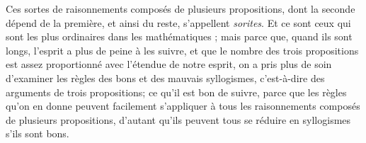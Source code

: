 Ces sortes de raisonnements composés de plusieurs propositions, dont la seconde dépend de la première, et ainsi du reste, s'appellent \emph{sorites}. Et ce sont ceux qui sont les plus ordinaires dans les mathématiques ; mais parce que, quand ils sont longs, l'esprit a plus de peine à les suivre, et que le nombre des trois propositions est assez proportionné avec l'étendue de notre esprit, on a pris plus de soin d'examiner les règles des bons et des mauvais syllogismes, c'est-à-dire des arguments de trois propositions; ce qu'il est bon de suivre, parce que les règles qu'on en donne peuvent facilement s'appliquer à tous les raisonnements composés de plusieurs propositions, d'autant qu'ils peuvent tous se réduire en syllogismes s'ils sont bons.


